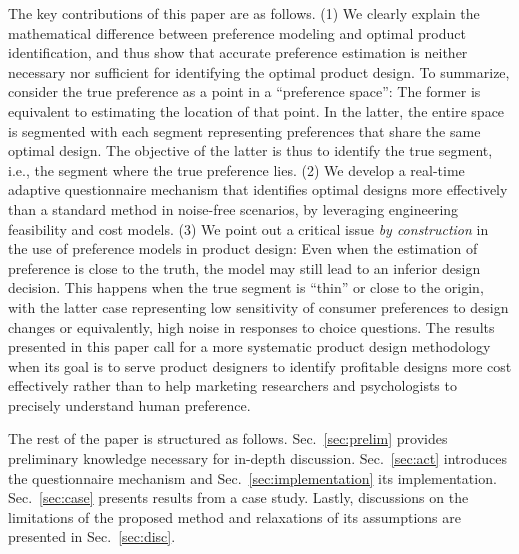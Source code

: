 \documentclass[onecolumn,11pt]{article}
\begin{document}
The key contributions of this paper are as follows. (1) We clearly explain the mathematical difference between preference modeling and optimal product identification, and thus show that accurate preference estimation is neither necessary nor sufficient for identifying the optimal product design. To summarize, consider the true preference as a point in a ``preference space'': The former is equivalent to estimating the location of that point. In the latter, the entire space is segmented with each segment representing preferences that share the same optimal design. The objective of the latter is thus to identify the true segment, i.e., the segment where the true preference lies. (2) We develop a real-time adaptive questionnaire mechanism that identifies optimal designs more effectively than a standard method in noise-free scenarios, by leveraging engineering feasibility and cost models. (3) We point out a critical issue {\it by construction} in the use of preference models in product design: Even when the estimation of preference is close to the truth, the model may still lead to an inferior design decision. This happens when the true segment is ``thin'' or close to the origin, with the latter case representing low sensitivity of consumer preferences to design changes or equivalently, high noise in responses to choice questions. The results presented in this paper call for a more systematic product design methodology when its goal is to serve product designers to identify profitable designs more cost effectively rather than to help marketing researchers and psychologists to precisely understand human preference.

The rest of the paper is structured as follows. Sec.~\ref{sec:prelim} provides preliminary knowledge necessary for in-depth discussion. Sec.~\ref{sec:act} introduces the questionnaire mechanism and Sec.~\ref{sec:implementation} its implementation. Sec.~\ref{sec:case} presents results from a case study. Lastly, discussions on the limitations of the proposed method and relaxations of its assumptions are presented in Sec.~\ref{sec:disc}.
\end{document}

